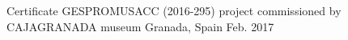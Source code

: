 



\begin{cvhonors}

  \cvhonor
    {Certificate} %
    {GESPROMUSACC (2016-295) project commissioned by CAJAGRANADA museum} %
    {Granada, Spain} %
    {Feb. 2017} %

\end{cvhonors}
